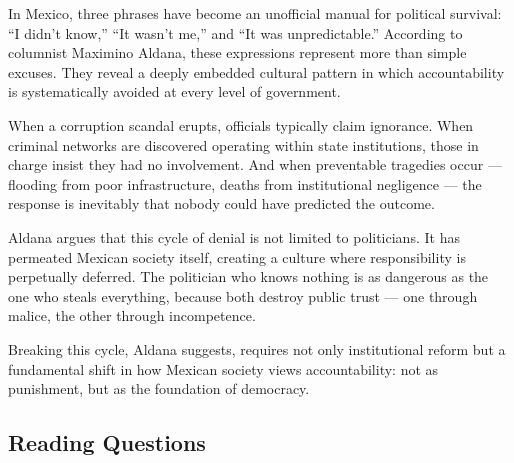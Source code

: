 \documentclass[10pt,a4paper]{article}
\begin{document}
\begin{tcolorbox}[colback=white, colframe=black]
\small
In Mexico, three phrases have become an unofficial manual for
political survival: ``I didn't know,'' ``It wasn't me,'' and
``It was unpredictable.'' According to columnist Maximino Aldana,
these expressions represent more than simple excuses. They reveal
a deeply embedded cultural pattern in which accountability is
systematically avoided at every level of government.

When a corruption scandal erupts, officials typically claim
ignorance. When criminal networks are discovered operating within
state institutions, those in charge insist they had no involvement.
And when preventable tragedies occur --- flooding from poor
infrastructure, deaths from institutional negligence --- the
response is inevitably that nobody could have predicted the outcome.

Aldana argues that this cycle of denial is not limited to
politicians. It has permeated Mexican society itself, creating a
culture where responsibility is perpetually deferred. The politician
who knows nothing is as dangerous as the one who steals everything,
because both destroy public trust --- one through malice, the other
through incompetence.

Breaking this cycle, Aldana suggests, requires not only
institutional reform but a fundamental shift in how Mexican society
views accountability: not as punishment, but as the foundation of
democracy.
\end{tcolorbox}

\subsection*{Reading Questions}
\end{document}
